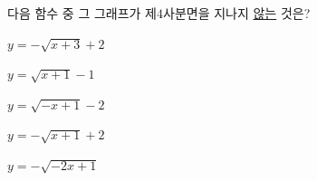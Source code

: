 \hspace*{2mm}\begin{minipage}[t]{\dimexpr\linewidth-2mm\relax}\vspace{0pt}
다음 함수 중 그 그래프가 제$4$사분면을 지나지 \underline{않는} 것은?
\begin{choicesii}{\rule[-3ex]{0pt}{8ex}$y=-\sqrt{x+3}+2$}{\rule[-3ex]{0pt}{8ex}$y=\sqrt{x+1}-1$}{\rule[-3ex]{0pt}{8ex}$y=\sqrt{-x+1}-2$}{\rule[-3ex]{0pt}{8ex}$y=-\sqrt{x+1}+2$}{\rule[-3ex]{0pt}{8ex}$y=-\sqrt{-2x+1}$}\end{choicesii}\end{minipage}
